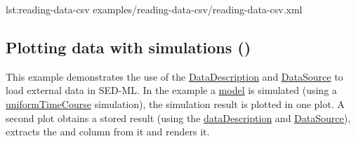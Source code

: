 {lst:reading-data-csv}
{examples/reading-data-csv/reading-data-csv.xml}

\subsection{Plotting data with simulations ()}
This example demonstrates the use of the \hyperref[class:dataDescription]{DataDescription} and \hyperref[class:dataSource]{DataSource} to load external data in SED-ML. In the example a \hyperref[class:model]{model} is simulated (using a \hyperref[class:uniformTimeCourse]{uniformTimeCourse} simulation), the simulation result is plotted in one plot. A second plot obtains a stored result (using the \hyperref[class:dataDescription]{dataDescription} and \hyperref[class:dataSource]{DataSource}), extracts the  and  column from it and renders it.

